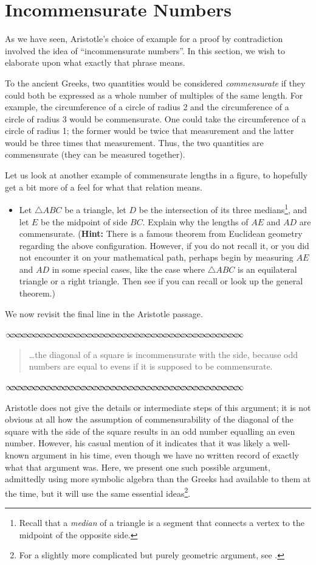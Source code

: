 \documentclass[11pt]{article}
\newcommand{\sep}{\vspace{-3pt}
\begin{center}
{\mathversion{normal}
$\infty \mspace{-5.5mu}\infty \mspace{-5.5mu}\infty \mspace{-5.5mu}\infty \mspace{-5.5mu}
\infty \mspace{-5.5mu}\infty \mspace{-5.5mu}\infty \mspace{-5.5mu}\infty \mspace{-5.5mu}
\infty \mspace{-5.5mu}\infty \mspace{-5.5mu}\infty \mspace{-5.5mu}\infty \mspace{-5.5mu}
\infty \mspace{-5.5mu}\infty \mspace{-5.5mu}\infty \mspace{-5.5mu}\infty \mspace{-5.5mu}
\infty \mspace{-5.5mu}\infty \mspace{-5.5mu}\infty \mspace{-5.5mu}\infty \mspace{-5.5mu}
\infty \mspace{-5.5mu}\infty \mspace{-5.5mu}\infty \mspace{-5.5mu}\infty \mspace{-5.5mu}
\infty \mspace{-5.5mu}\infty \mspace{-5.5mu}\infty \mspace{-5.5mu}\infty \mspace{-5.5mu}
\infty \mspace{-5.5mu}\infty \mspace{-5.5mu}\infty \mspace{-5.5mu}\infty \mspace{-5.5mu}
\infty \mspace{-5.5mu}\infty \mspace{-5.5mu}\infty \mspace{-5.5mu}\infty \mspace{-5.5mu}
\infty \mspace{-5.5mu}\infty \mspace{-5.5mu}\infty \mspace{-5.5mu}\infty \mspace{-5.5mu}$}
\end{center} \vspace*{-5pt}}
\newenvironment{source}%
 {\bigskip \sep \vspace*{-6pt} \begin{quote}
          \begin{sf}   }
   {   \end{sf}     \end{quote} \vspace*{-6pt} \sep \bigskip}%
\newcounter{tasknumb}
\newcommand{\tasknumb}[1]{\refstepcounter{tasknumb}\textmd{\textbf{$\fbox{$\fbox{Task \thetasknumb}$}$}}#1}
\newenvironment{task}[1][]%
 {\begin{itemize}
 \item[\tasknumb{#1}]  }
{
    \end{itemize}    }%
\begin{document}
\section{Incommensurate Numbers}\label{incommensurate}

As we have seen, Aristotle's choice of example for a proof by contradiction involved the idea of ``{\sf incommensurate numbers}''.  In this section, we wish to elaborate upon what exactly that phrase means.

To the ancient Greeks, two quantities would be considered \emph{commensurate} if they could both be expressed as a whole number of multiples of the same length.  For example, the circumference of a circle of radius 2 and the circumference of a circle of radius 3 would be commensurate.  One could take the circumference of a circle of radius 1; the former would be twice that measurement and the latter would be three times that measurement.  Thus, the two quantities are commensurate (they can be measured together).  

Let us look at another example of commensurate lengths in a figure, to hopefully get a bit more of a feel for what that relation means.

\begin{task}
    Let $\triangle ABC$ be a triangle, let $D$ be the intersection of its three medians\footnote{Recall that a \emph{median} of a triangle is a segment that connects a vertex to the midpoint of the opposite side.}, and let $E$ be the midpoint of side $BC$. Explain why the lengths of $AE$ and $AD$ are commensurate.  ({\bf Hint:} There is a famous theorem from Euclidean geometry regarding the above configuration. However, if you do not recall it, or you did not encounter it on your mathematical path, perhaps begin by measuring $AE$ and $AD$ in some special cases, like the case where $\triangle ABC$ is an equilateral triangle or a right triangle. Then see if you can recall or look up the general theorem.)
\end{task}

We now revisit the final line in the Aristotle passage. 

\begin{source}
\ldots the diagonal of a square is incommensurate with the side, because odd numbers are equal to evens if it is supposed to be commensurate.
\end{source}

Aristotle does not give the details or intermediate steps of this argument; it is not obvious at all how the assumption of commensurability of the diagonal of the square with the side of the square results in an odd number equalling an even number.  However, his casual mention of it indicates that it was likely a well-known argument in his time, even though we have no written record of exactly what that argument was.  Here, we present one such possible argument, admittedly using more symbolic algebra than the Greeks had available to them at the time, but it will use the same essential ideas\footnote{For a slightly more complicated but purely geometric argument, see \citep[51]{Katz}.}. 
\end{document}
